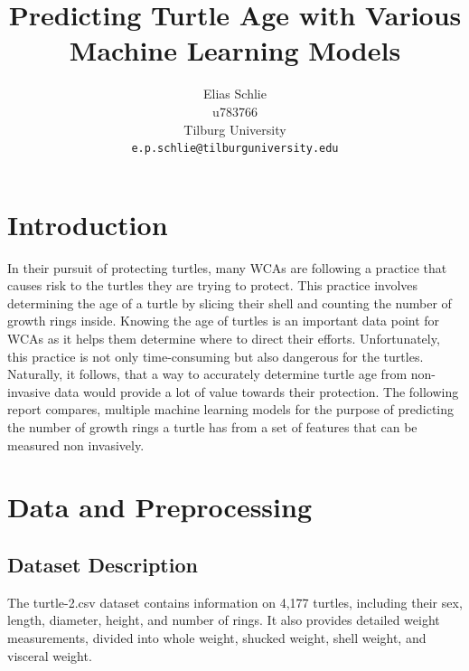 \documentclass[twocolumn]{article}
\title{Predicting Turtle Age with Various Machine Learning Models}
\author{
 Elias Schlie \\
 u783766 \\
 Tilburg University \\
  \texttt{e.p.schlie@tilburguniversity.edu}
}
\date{}
\begin{document}

\section{Introduction}

In their pursuit of protecting turtles, many WCAs are following a practice that causes risk to the turtles they are trying to protect. 
This practice involves determining the age of a turtle by slicing their shell and counting the number of growth rings inside. 
Knowing the age of turtles is an important data point for WCAs as it helps them determine where to direct their efforts. 
Unfortunately, this practice is not only time-consuming but also dangerous for the turtles. 
Naturally, it follows, that a way to accurately determine turtle age from non-invasive data would provide a lot of value towards their protection. 
The following report compares, multiple machine learning models for the purpose of predicting the number of growth rings a turtle has from a set of features that can be measured non invasively.

\section{Data and Preprocessing}

\subsection{Dataset Description}
The turtle-2.csv dataset contains information on 4,177 turtles, including their sex, length, diameter, height, and number of rings. 
It also provides detailed weight measurements, divided into whole weight, shucked weight, shell weight, and visceral weight.
\end{document}
